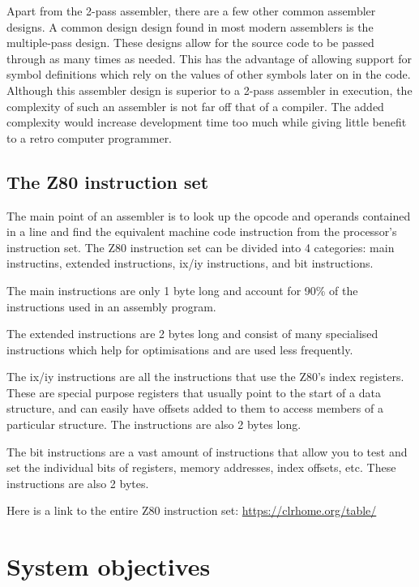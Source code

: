 \documentclass[a4paper]{report}
\begin{document}
Apart from the 2-pass assembler, there are a few other common assembler designs.
A common design design found in most modern assemblers is the multiple-pass
design. These designs allow for the source code to be passed through as many
times as needed. This has the advantage of allowing support for symbol
definitions which rely on the values of other symbols later on in the code.
Although this assembler design is superior to a 2-pass assembler in execution,
the complexity of such an assembler is not far off that of a compiler. The added
complexity would increase development time too much while giving little benefit
to a retro computer programmer.

\subsection{The Z80 instruction set}

The main point of an assembler is to look up the opcode and operands contained
in a line and find the equivalent machine code instruction from the processor's
instruction set. The Z80 instruction set can be divided into 4 categories: main
instructins, extended instructions, ix/iy instructions, and bit instructions.

The main instructions are only 1 byte long and account for 90\% of the
instructions used in an assembly program.

The extended instructions are 2 bytes long and consist of many specialised
instructions which help for optimisations and are used less frequently.

The ix/iy instructions are all the instructions that use the Z80's index
registers. These are special purpose registers that usually point to the start
of a data structure, and can easily have offsets added to them to access members
of a particular structure. The instructions are also 2 bytes long.

The bit instructions are a vast amount of instructions that allow you to test
and set the individual bits of registers, memory addresses, index offsets, etc.
These instructions are also 2 bytes.

Here is a link to the entire Z80 instruction set: \url{https://clrhome.org/table/}


\section{System objectives}
\end{document}

